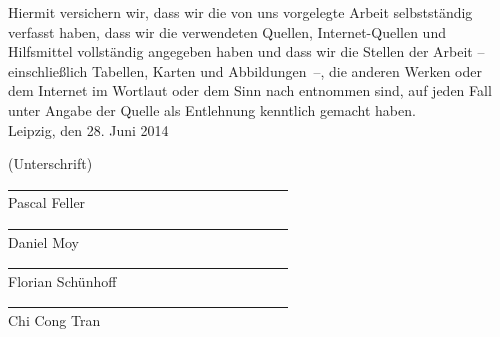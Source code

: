 \newpage
\pagestyle{empty}


\text{ }
\vspace{11.5cm}




Hiermit versichern wir, dass wir die von uns vorgelegte Arbeit selbstständig verfasst haben, dass wir die verwendeten Quellen, Internet-Quellen und Hilfsmittel vollständig angegeben haben und dass wir die Stellen der Arbeit -- einschließlich Tabellen, Karten und Abbildungen~--, die anderen Werken oder dem Internet im Wortlaut oder dem Sinn nach entnommen sind, auf jeden Fall unter Angabe der Quelle als Entlehnung kenntlich gemacht haben.\\

Leipzig, den 28. Juni 2014\\
\medskip
\medskip

(Unterschrift)\\
\underline{~~~~~~~~~~~~~~~~~~~~~~~~~~~~~~~~~~~~~~~~}\\
Pascal Feller\\
\underline{~~~~~~~~~~~~~~~~~~~~~~~~~~~~~~~~~~~~~~~~}\\
Daniel Moy\\
\underline{~~~~~~~~~~~~~~~~~~~~~~~~~~~~~~~~~~~~~~~~}\\
Florian Schünhoff\\
\underline{~~~~~~~~~~~~~~~~~~~~~~~~~~~~~~~~~~~~~~~~}\\
Chi Cong Tran\\

\newpage


